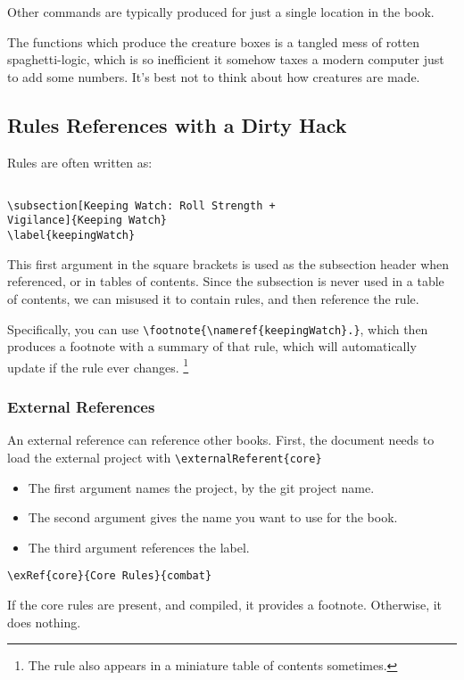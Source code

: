 \documentclass[a4paper,openany]{book}
\begin{document}
\begin{multicols}{2}

Other commands are typically produced for just a single location in the book.

The functions which produce the creature boxes is a tangled mess of rotten spaghetti-logic, which is so inefficient it somehow taxes a modern computer just to add some numbers.
It's best not to think about how creatures are made.

\subsection{Rules References with a Dirty Hack}

Rules are often written as:

\begin{verbatim}

\subsection[Keeping Watch: Roll Strength +
Vigilance]{Keeping Watch}
\label{keepingWatch}

\end{verbatim}

This first argument in the square brackets is used as the subsection header when referenced, or in tables of contents.
Since the subsection is never used in a table of contents, we can misused it to contain rules, and then reference the rule.

Specifically, you can use \verb"\footnote{\nameref{keepingWatch}.}", which then produces a footnote with a summary of that rule, which will automatically update if the rule ever changes.
\footnote{The rule also appears in a miniature table of contents sometimes.}

\subsubsection{External References}

An external reference can reference other books.
First, the document needs to load the external project with \verb"\externalReferent{core}"


\begin{itemize}
  \item
  The first argument names the project, by the git project name.
  \item
  The second argument gives the name you want to use for the book.
  \item
  The third argument references the label.
\end{itemize}

\verb"\exRef{core}{Core Rules}{combat}"

If the core rules are present, and compiled, it provides a footnote.
Otherwise, it does nothing.%

\end{multicols}

\printindex[spells]

\printglossary[
  style=topicmcols,
  type=mech,
]

\printglossary[
  style=topicmcols,
]

\glsaddall
\end{document}
